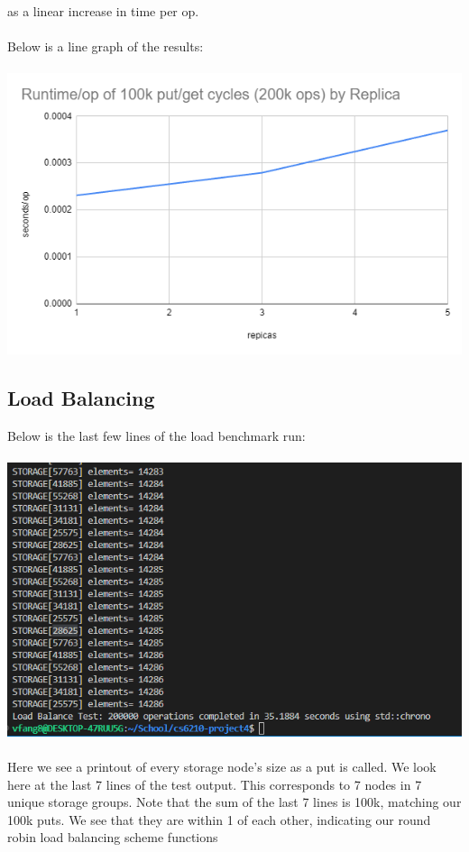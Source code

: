 \documentclass{article}
\begin{document}
as a linear increase in time per op.\\\\
Below is a line graph of the results:\\\\
\includegraphics[width=\linewidth]{img/PerformanceChart.png} 

\pagebreak
\subsection{Load Balancing}
Below is the last few lines of the load benchmark run:\\\\
\includegraphics[width=\linewidth]{img/load71.png}\\\\

Here we see a printout of every storage node's size as a put is called. We look here at the last 7 lines of the test output. This corresponds to 7 nodes in 7 unique
storage groups. Note that the sum of the last 7 lines is 100k, matching our 100k puts. We see that they are within 1 of each other, 
indicating our round robin load balancing scheme functions
\end{document}
